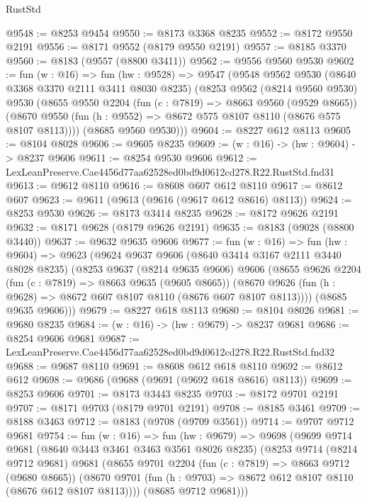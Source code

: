 \begin{lexlean}{RustStd}
\begin{coremodule}
@9548 := @8253 @9454
@9550 := @8173 @3368 @8235
@9552 := @8172 @9550 @2191
@9556 := @8171 @9552 (@8179 @9550 @2191)
@9557 := @8185 @3370
@9560 := @8183 (@9557 (@8800 @3411))
@9562 := @9556 @9560 @9530
@9602 := fun (w : @16) =>
  fun (hw : @9528) =>
  @9547
    (@9548
      @9562
      @9530
      (@8640 @3368 @3370 @2111 @3411 @8030 @8235)
      (@8253
        @9562
        (@8214 @9560 @9530)
        @9530
        (@8655
          @9550
          @2204
          (fun (c : @7819) => @8663 @9560 (@9529 @8665))
          (@8670 @9550 (fun (h : @9552) => @8672 @575 @8107 @8110 (@8676 @575 @8107 @8113))))
        (@8685 @9560 @9530)))
@9604 := @8227 @612 @8113
@9605 := @8104 @8028
@9606 := @9605 @8235
@9609 := (w : @16) -> (hw : @9604) -> @8237 @9606
@9611 := @8254 @9530 @9606
@9612 := LexLeanPreserve.Cae4456d77aa62528ed0bd9d0612cd278.R22.RustStd.fnd31
@9613 := @9612 @8110
@9616 := @8608 @607 @612 @8110
@9617 := @8612 @607
@9623 := @9611 (@9613 (@9616 (@9617 @612 @8616) @8113))
@9624 := @8253 @9530
@9626 := @8173 @3414 @8235
@9628 := @8172 @9626 @2191
@9632 := @8171 @9628 (@8179 @9626 @2191)
@9635 := @8183 (@9028 (@8800 @3440))
@9637 := @9632 @9635 @9606
@9677 := fun (w : @16) =>
  fun (hw : @9604) =>
  @9623
    (@9624
      @9637
      @9606
      (@8640 @3414 @3167 @2111 @3440 @8028 @8235)
      (@8253
        @9637
        (@8214 @9635 @9606)
        @9606
        (@8655
          @9626
          @2204
          (fun (c : @7819) => @8663 @9635 (@9605 @8665))
          (@8670 @9626 (fun (h : @9628) => @8672 @607 @8107 @8110 (@8676 @607 @8107 @8113))))
        (@8685 @9635 @9606)))
@9679 := @8227 @618 @8113
@9680 := @8104 @8026
@9681 := @9680 @8235
@9684 := (w : @16) -> (hw : @9679) -> @8237 @9681
@9686 := @8254 @9606 @9681
@9687 := LexLeanPreserve.Cae4456d77aa62528ed0bd9d0612cd278.R22.RustStd.fnd32
@9688 := @9687 @8110
@9691 := @8608 @612 @618 @8110
@9692 := @8612 @612
@9698 := @9686 (@9688 (@9691 (@9692 @618 @8616) @8113))
@9699 := @8253 @9606
@9701 := @8173 @3443 @8235
@9703 := @8172 @9701 @2191
@9707 := @8171 @9703 (@8179 @9701 @2191)
@9708 := @8185 @3461
@9709 := @8188 @3463
@9712 := @8183 (@9708 (@9709 @3561))
@9714 := @9707 @9712 @9681
@9754 := fun (w : @16) =>
  fun (hw : @9679) =>
  @9698
    (@9699
      @9714
      @9681
      (@8640 @3443 @3461 @3463 @3561 @8026 @8235)
      (@8253
        @9714
        (@8214 @9712 @9681)
        @9681
        (@8655
          @9701
          @2204
          (fun (c : @7819) => @8663 @9712 (@9680 @8665))
          (@8670 @9701 (fun (h : @9703) => @8672 @612 @8107 @8110 (@8676 @612 @8107 @8113))))
        (@8685 @9712 @9681)))

\end{coremodule}
\end{lexlean}
